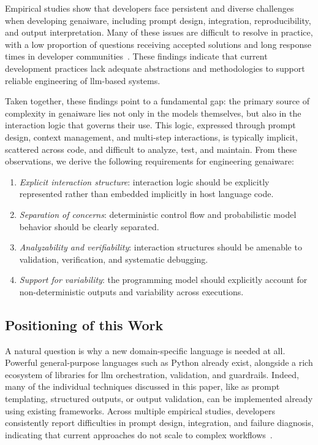 \documentclass[manuscript,screen]{acmart}
\begin{document}
Empirical studies show that developers face persistent and diverse challenges when developing \ac{genai}ware, including prompt design, integration, reproducibility, and output interpretation.
Many of these issues are difficult to resolve in practice, with a low proportion of questions receiving accepted solutions and long response times in developer communities~\cite{DBLP:journals/tosem/ChenGCZL25}.
These findings indicate that current development practices lack adequate abstractions and methodologies to support reliable engineering of \ac{llm}-based systems.

Taken together, these findings point to a fundamental gap: the primary source of complexity in \ac{genai}ware lies not only in the models themselves, but also in the interaction logic that governs their use. 
This logic, expressed through prompt design, context management, and multi-step interactions, is typically implicit, scattered across code, and difficult to analyze, test, and maintain.
From these observations, we derive the following requirements for engineering \ac{genai}ware:
\begin{enumerate}[label=R\arabic*]
    \item \emph{Explicit interaction structure}: interaction logic should be explicitly represented rather than embedded implicitly in host language code.
    \item \emph{Separation of concerns}: deterministic control flow and probabilistic model behavior should be clearly separated.
    \item \emph{Analyzability and verifiability}: interaction structures should be amenable to validation, verification, and systematic debugging.
    \item \emph{Support for variability}: the programming model should explicitly account for non-deterministic outputs and variability across executions.
\end{enumerate}

\subsection{Positioning of this Work}
\label{sec:positioningofthiswork}

A natural question is why a new domain-specific language is needed at all.
Powerful general-purpose languages such as Python already exist, alongside a rich ecosystem of libraries for \ac{llm} orchestration, validation, and guardrails.
Indeed, many of the individual techniques discussed in this paper, like as prompt templating, structured outputs, or output validation, can be implemented already using existing frameworks.
Across multiple empirical studies, developers consistently report difficulties in prompt design, integration, and failure diagnosis, indicating that current approaches do not scale to complex workflows~\cite{10.1145/3544549.3585737}.
\end{document}
